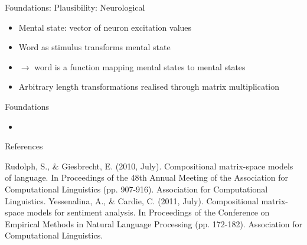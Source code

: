 \documentclass[12pt,a4paper]{beamer}
\begin{document}
\begin{frame}{Foundations: Plausibility: Neurological}
\begin{itemize}
\item Mental state: vector of neuron excitation values
\item Word as stimulus transforms mental state
\item $\to$ word is a function mapping mental states to mental states
\item Arbitrary length transformations realised through matrix multiplication
\end{itemize}
\end{frame}



\begin{frame}{Foundations}
\begin{itemize}
\item
\end{itemize}
\end{frame}



\begin{frame}[allowframebreaks]{References}
\begin{thebibliography}{-}
 Rudolph, S., \& Giesbrecht, E. (2010, July). Compositional matrix-space models of language. In Proceedings of the 48th Annual Meeting of the Association for Computational Linguistics (pp. 907-916). Association for Computational Linguistics.
 Yessenalina, A., \& Cardie, C. (2011, July). Compositional matrix-space models for sentiment analysis. In Proceedings of the Conference on Empirical Methods in Natural Language Processing (pp. 172-182). Association for Computational Linguistics.
\end{thebibliography}
\end{frame}
\end{document}
